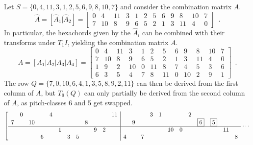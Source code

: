 \begin{example}
	\label{ex:martino-derivation}
	\cite[231]{Martino1961}
	Let $S = \{ 0, 4, 11, 3, 1, 2, 5, 6, 9, 8, 10, 7 \}$ and consider the combination matrix $\hat{A}$.
	\begin{equation}
    	\hat{A} = [\hat{A}_1 | \hat{A}_2] = \left[
    	\begin{array}{cccccc|cccccc}
        	0 & 4 & 11 & 3 & 1 & 2 & 5 & 6 & 9 & 8 & 10 & 7 \\
        	7 & 10 & 8 & 9 & 6 & 5 & 2 & 1 & 3 & 11 & 4 & 0
    	\end{array}
    	\right] \enspace.
	\end{equation}
	In particular, the hexachords given by the $\hat{A}_i$ can be combined with their transforms under $T_1I$, yielding the combination matrix $A$.
	\begin{equation}
    	A = [A_1 | A_2 | A_3 | A_4] = \left[
    	\begin{array}{ccc|ccc|ccc|ccc}
        	0 & 4 & 11 & 3 & 1 & 2 & 5 & 6 & 9 & 8 & 10 & 7 \\
        	7 & 10 & 8 & 9 & 6 & 5 & 2 & 1 & 3 & 11 & 4 & 0 \\
        	\hline
        	1 & 9 & 2 & 10 & 0 & 11 & 8 & 7 & 4 & 5 & 3 & 6 \\
        	6 & 3 & 5 & 4 & 7 & 8 & 11 & 0 & 10 & 2 & 9 & 1
    	\end{array}
    	\right] \enspace.
	\end{equation}
	The row $Q = \{ 7, 0, 10, 6, 4, 1, 3, 5, 8, 9, 2, 11 \}$ can then be derived from the first column of $A$, but $T_9(Q)$ can only partially be derived from the second column of $A$, as pitch-classes 6 and 5 get swapped.
	\begin{equation}
        \left[
        \begin{array}{cccccccccccc|cccccccccccc}
            & 0 &&& 4 &&&&&&& 11 &&&& 3 & 1 &&& 2 &&&& \\
            7 && 10 &&&&&& 8 &&& && 9 &&&&&&& \boxed{6} & \boxed{5} && \\
            \hline
            &&&&& 1 &&&& 9 & 2 & &&&&&& 10 & 0 &&&& 11 & \\
            &&& 6 &&& 3 & 5 &&&& & 4 && 7 &&&&&&&&& 8
        \end{array}
        \right. \cdots
    \end{equation}
\end{example}

